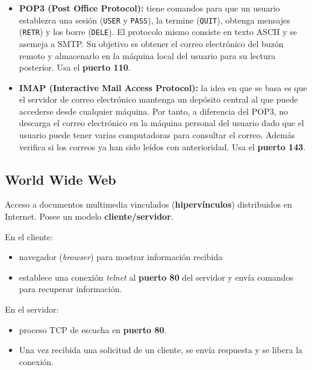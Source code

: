 \documentclass[10pt,a4paper]{article}
\begin{document}
\begin{itemize}
\item \textbf{POP3 (Post Office Protocol):} tiene comandos para que un usuario establezca una sesión (\texttt{USER} y \texttt{PASS}), la termine (\texttt{QUIT}), obtenga mensajes (\texttt{RETR}) y los borre (\texttt{DELE}). El protocolo mismo consiste en texto ASCII y se asemeja a SMTP. Su objetivo es obtener el correo electrónico del buzón remoto y almacenarlo en la máquina local del usuario para su lectura posterior. Usa el \textbf{puerto 110}.
\item \textbf{IMAP (Interactive Mail Access Protocol):} la idea en que se basa es que el servidor de correo electrónico mantenga un depósito central al que puede accederse desde
cualquier máquina. Por tanto, a diferencia del POP3, no descarga el correo electrónico en la máquina personal del usuario dado que el usuario puede tener varias computadoras para consultar el correo. Además verifica si los correos ya han sido leídos con anterioridad. Usa el \textbf{puerto 143}.
\end{itemize}

\subsection{World Wide Web}

Acceso a documentos multimedia vinculados (\textbf{hipervínculos}) distribuidos en Internet. Posee un modelo \textbf{cliente/servidor}. 

\begin{multicols}{2}
\raggedcolumns

En el cliente:
\begin{itemize}
\item navegador (\textit{browser}) para mostrar información recibida 
\item establece una conexión \textit{telnet} al \textbf{puerto 80} del servidor y envía comandos para recuperar información.
\end{itemize}

\columnbreak

En el servidor:
\begin{itemize}
\item proceso TCP de escucha en \textbf{puerto 80}.
\item Una vez recibida una solicitud de un cliente, se envía respuesta y se libera la conexión.
\end{itemize}

\end{multicols}
\end{document}
